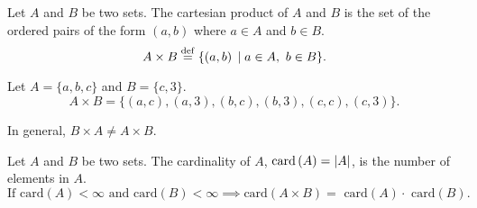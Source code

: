 
\begin{defi}
    Let $A$ and $B$ be two sets. The cartesian product of $A$ and $B$ is the set of the ordered pairs of the form $\left( a, b \right)$ where $a\in A$ and $b\in B$.
    \begin{equation}
        A\times B \overset{\mathrm{def}}{=} \{\left( a, b \right) \; | \; a\in A,\ b\in B\}.
    \end{equation}
\end{defi}

\begin{example}
Let $A = \{a, b, c\} $ and $B = \{c, 3\} $.
    \begin{equation}
        A\times B = \{\left( a, c \right), \left( a, 3 \right), \left( b, c \right), \left( b, 3 \right), \left( c, c \right), \left( c, 3 \right)\}.
    \end{equation}
\end{example}

\begin{note}
    In general, $B\times A\neq A\times B$.
\end{note}

\begin{defi}[Cardinality]
    Let $A$ and $B$ be two sets. The cardinality of $A$, $\textrm{card}\left( A \right) = \left\vert A \right\vert$, is the number of elements in $A$.
    \begin{equation}
        \textrm{If card}\left( A \right) < \infty\textrm{ and } \textrm{card}\left( B \right) < \infty \implies \textrm{card}\left( A\times B \right) = \textrm{ card}\left( A \right)\cdot \textrm{ card}\left( B \right).
    \end{equation}
\end{defi}


